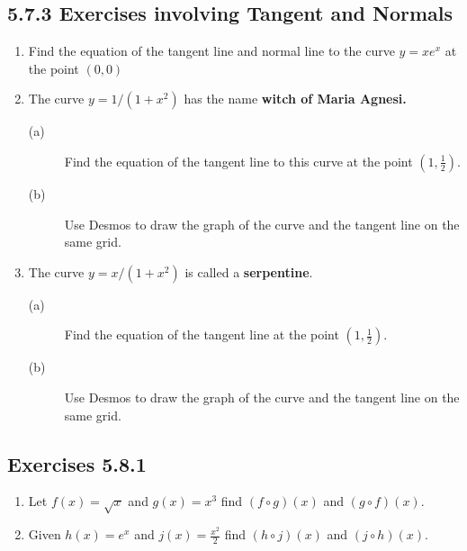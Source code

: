 \subsection{5.7.3 Exercises involving Tangent and Normals}
\begin{enumerate}
	\item Find the equation of the tangent line and normal line to the curve $y =x e^{x}$ at the point $\left (0 ,0\right )$ 
	
	\item The
	curve $y =1/(1 +x^{2})$ has the name \textbf{witch of Maria Agnesi.} 
	
	
	\begin{description}
		\item [(a)] Find the equation of the tangent line to this curve at the point
		$\left (1 ,\frac{1}{2}\right )$. 
		
		\item [(b)]
		Use Desmos to draw the graph of the curve and the tangent line on the same grid. \end{description}
	
	\item The
	curve $y =x/(1 +x^{2})$ is called a \textbf{serpentine}. 
	
	
	\begin{description}
		\item [(a)] Find the equation of the tangent line at the point $\left (1 ,\frac{1}{2}\right )$. 
		
		\item [(b)]
		Use Desmos to draw the graph of the curve and the tangent line on the same grid. \end{description}\end{enumerate}


\subsection{Exercises 5.8.1}
\begin{enumerate}
	\item Let $f (x) =\sqrt{x}$ and $g (x) =x^{3}$ find $\left (f \circ g\right ) (x)$ and $\left (g \circ f\right ) \left (x\right )$. 
	
	\item Given $h \left (x\right ) =e^{x}$ and $j (x) =\frac{x^{2}}{2}$ find $\left (h \circ j\right ) (x)$ and $\left (j \circ h\right ) (x)$. \end{enumerate}


